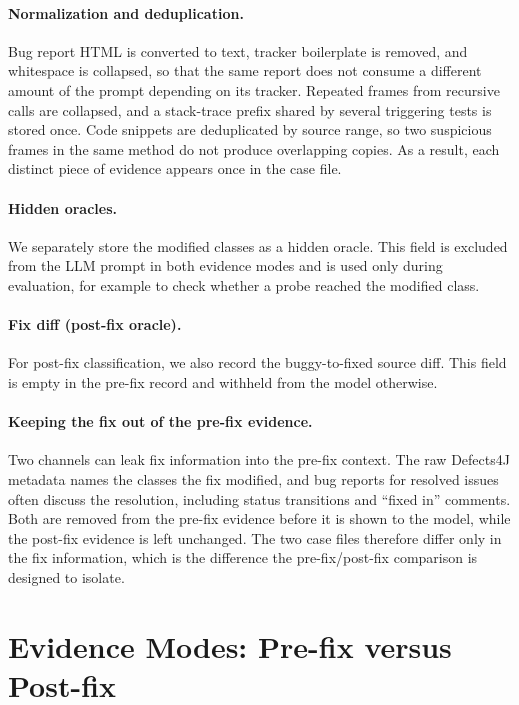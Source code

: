 \documentclass{iutbscthesis}
\begin{document}
\paragraph{Normalization and deduplication.} Bug report HTML is converted to text, tracker boilerplate is removed, and whitespace is collapsed, so that the same report does not consume a different amount of the prompt depending on its tracker. Repeated frames from recursive calls are collapsed, and a stack-trace prefix shared by several triggering tests is stored once. Code snippets are deduplicated by source range, so two suspicious frames in the same method do not produce overlapping copies. As a result, each distinct piece of evidence appears once in the case file.

\paragraph{Hidden oracles.} We separately store the modified classes as a hidden oracle. This field is excluded from the LLM prompt in both evidence modes and is used only during evaluation, for example to check whether a probe reached the modified class.

\paragraph{Fix diff (post-fix oracle).} For post-fix classification, we also record the buggy-to-fixed source diff. This field is empty in the pre-fix record and withheld from the model otherwise.

\paragraph{Keeping the fix out of the pre-fix evidence.} Two channels can leak fix information into the pre-fix context. The raw Defects4J metadata names the classes the fix modified, and bug reports for resolved issues often discuss the resolution, including status transitions and ``fixed in'' comments. Both are removed from the pre-fix evidence before it is shown to the model, while the post-fix evidence is left unchanged. The two case files therefore differ only in the fix information, which is the difference the pre-fix/post-fix comparison is designed to isolate.

\section{Evidence Modes: Pre-fix versus Post-fix}
\label{sec:evidence_modes}
\end{document}
